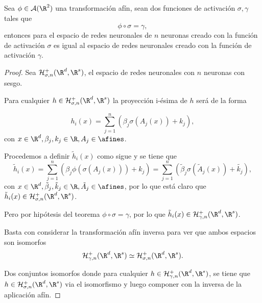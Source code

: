 \begin{aportacionOriginal}

\begin{teorema}\label{teo:eficacia-funciones-activation}
    Sea $\phi \in \mathcal{A}(\R^2)$ una transformación afín, sean dos funciones de activación $\sigma, \gamma$ tales que 
    \begin{equation*}
        \phi \circ \sigma = \gamma,
    \end{equation*}
    entonces para 
    el espacio de redes neuronales de $n$ neuronas creado con la función de activación $\sigma$ es  
    igual al espacio de redes neuronales creado con la función de activación $\gamma$. 
\end{teorema}
\begin{proof}

    Sea $\mathcal{H}^+_{\sigma, n}(\R^d, \R^s)$, el espacio de redes neuronales con $n$ neuronas con sesgo. 

    Para cualquier $h  \in \mathcal{H}^+_{\sigma, n}(\R^d, \R^s)$
    la proyección i-ésima de $h$ será de la forma 

    \begin{equation*}
        h_i(x) = \sum^n_{j=1}(\beta_{j} \sigma(A_j(x))+ k_j),
    \end{equation*}
    con $x \in \R^d, \beta_{j}, k_j \in \R, A_j \in \afines$. 

    Procedemos a definir $\tilde{h}_i(x)$ como sigue y
    se tiene que 
    \begin{equation*}
        \tilde{h}_i(x) 
        = \sum^n_{j=1}(\beta_{j}  \phi(\sigma(A_j(x)))+ k_j)
        = \sum^n_{j=1}(\tilde{\beta}_{j} \sigma(\tilde{A}_j(x))+ \tilde{k_j}),
    \end{equation*}
    con $x \in \R^d, \tilde \beta_{j}, \tilde k_j \in \R, \tilde{A}_j \in \afines$,
    por lo que está claro que $\tilde{h}_i(x) \in \mathcal{H}^+_{\sigma, n}(\R^d, \R^s)$. 

    Pero por hipótesis del teorema $\phi \circ \sigma = \gamma$, por lo que $\tilde{h}_i(x) \in \mathcal{H}^+_{\gamma, n}(\R^d, \R^s)$. 

    Basta con considerar la transformación afín inversa para ver que ambos espacios son isomorfos
    \begin{equation*}
        \mathcal{H}^+_{\gamma, n}(\R^d, \R^s) \simeq \mathcal{H}^+_{\sigma, n}(\R^d, \R^s).
    \end{equation*}

    Dos conjuntos isomorfos donde para cualquier $h \in \mathcal{H}^+_{\gamma, n}(\R^d, \R^s)$, 
    se tiene que $h \in \mathcal{H}^+_{\sigma, n}(\R^d, \R^s)$ via el isomorfismo y 
    luego componer con la inversa de la aplicación afín. 


\end{proof}
\end{aportacionOriginal}
